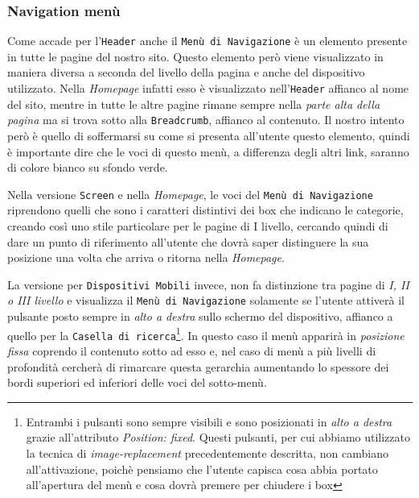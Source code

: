 \subsubsection{Navigation menù}\label{sec:Pres-Nav}
Come accade per l'\texttt{Header} anche il \texttt{Menù di Navigazione} è un elemento presente in tutte le pagine del nostro sito. Questo elemento però viene visualizzato in maniera diversa a seconda del livello della pagina e anche del dispositivo utilizzato. Nella \textit{Homepage} infatti esso è visualizzato nell'\texttt{Header} affianco al nome del sito, mentre in tutte le altre pagine rimane sempre nella \textit{parte alta della pagina} ma si trova sotto alla \texttt{Breadcrumb}, affianco al contenuto. Il nostro intento però è quello di soffermarsi su come si presenta all'utente questo elemento, quindi è importante dire che le voci di questo menù, a differenza degli altri link, saranno di colore bianco su sfondo verde.

Nella versione \texttt{Screen} e nella \textit{Homepage}, le voci del \texttt{Menù di Navigazione} riprendono quelli che sono i caratteri distintivi dei box che indicano le categorie, creando così uno stile particolare per le pagine di I livello, cercando quindi di dare un punto di riferimento all'utente che dovrà saper distinguere la sua posizione una volta che arriva o ritorna nella \textit{Homepage}.

La versione per \texttt{Dispositivi Mobili} invece, non fa distinzione tra pagine di \textit{I, II o III livello} e visualizza il \texttt{Menù di Navigazione} solamente se l'utente attiverà il pulsante posto sempre in \textit{alto a destra} sullo schermo del dispositivo, affianco a quello per la \texttt{Casella di ricerca}\footnote{Entrambi i pulsanti sono sempre visibili e sono posizionati in \textit{alto a destra} grazie all'attributo \textit{Position: fixed}. Questi pulsanti, per cui abbiamo utilizzato la tecnica di \textit{image-replacement} precedentemente descritta, non cambiano all'attivazione, poichè pensiamo che l'utente capisca cosa abbia portato all'apertura del menù e cosa dovrà premere per chiudere i box}. In questo caso il menù apparirà in \textit{posizione fissa} coprendo il contenuto sotto ad esso e, nel caso di menù a più livelli di profondità cercherà di rimarcare questa gerarchia aumentando lo spessore dei bordi superiori ed inferiori delle voci del sotto-menù.

